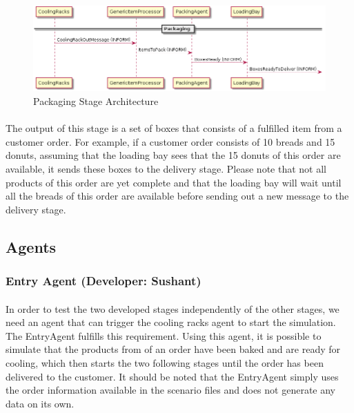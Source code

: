 \documentclass[11pt, a4paper]{article}
\begin{document}
\begin{figure}[h!]
	\centering
	\includegraphics[width=\textwidth]{../Architecture/Architecture_Packaging.png}
	\caption{Packaging Stage Architecture}
	\label{PackagingArchitecture}
\end{figure}

\paragraph{}
The output of this stage is a set of boxes that consists of a fulfilled item from a customer order. For example, if a customer order consists of 10 breads and 15 donuts, assuming that the loading bay sees that the 15 donuts of this order are available, it sends these boxes to the delivery stage. Please note that not all products of this order are yet complete and that the loading bay will wait until all the breads of this order are available before sending out a new message to the delivery stage.

\hfill\break
\subsection{Agents}\label{PackagingAgents}
\subsubsection{Entry Agent (Developer: Sushant)}
\paragraph{}
In order to test the two developed stages independently of the other stages, we need an agent that can trigger the cooling racks agent to start the simulation. The EntryAgent fulfills this requirement. Using this agent, it is possible to simulate that the products from of an order have been baked and are ready for cooling, which then starts the two following stages until the order has been delivered to the customer. It should be noted that the EntryAgent simply uses the order information available in the scenario files and does not generate any data on its own.
\end{document}
